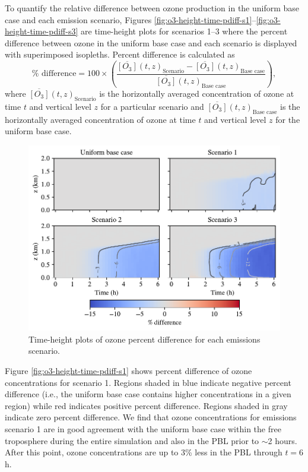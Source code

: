 To quantify the relative difference between ozone production in the uniform base case and each emission scenario, Figures \ref{fig:o3-height-time-pdiff-s1}--\ref{fig:o3-height-time-pdiff-s3} are time-height plots for scenarios 1--3 where the percent difference between ozone in the uniform base case and each scenario is displayed with superimposed isopleths. Percent difference is calculated as 
\begin{equation}
    \% \text{ difference} = 100\times\left(\frac{\overline{[O_3]}(t, z)_{\text{Scenario}} - \overline{[O_3]}(t, z)_{\text{Base case}}}{\overline{[O_3]}(t, z)_{\text{Base case}}}\right),
\end{equation}
where $\overline{[O_3]}(t, z)_{\text{Scenario}}$ is the horizontally averaged concentration of ozone at time $t$ and vertical level $z$ for a particular scenario and $\overline{[O_3]}(t, z)_{\text{Base case}}$ is the horizontally averaged concentration of ozone at time $t$ and vertical level $z$ for the uniform base case.

\begin{figure}[h]
  \centering
    \includegraphics[width=\textwidth]{figures/chapter4/height-time-o3-pdiff-four-scenarios.pdf}
    \caption{Time-height plots of ozone percent difference for each emissions scenario.}
    \label{fig:ht-pdiff-o3}
\end{figure}

Figure \ref{fig:o3-height-time-pdiff-s1} shows percent difference of ozone concentrations for scenario 1. Regions shaded in blue indicate negative percent difference (i.e., the uniform base case contains higher concentrations in a given region) while red indicates positive percent difference. Regions shaded in gray indicate zero percent difference. We find that ozone concentrations for emissions scenario 1 are in good agreement with the uniform base case within the free troposphere during the entire simulation and also in the PBL prior to $\sim$2 hours. After this point, ozone concentrations are up to 3\% less in the PBL through $t=6$ h.

